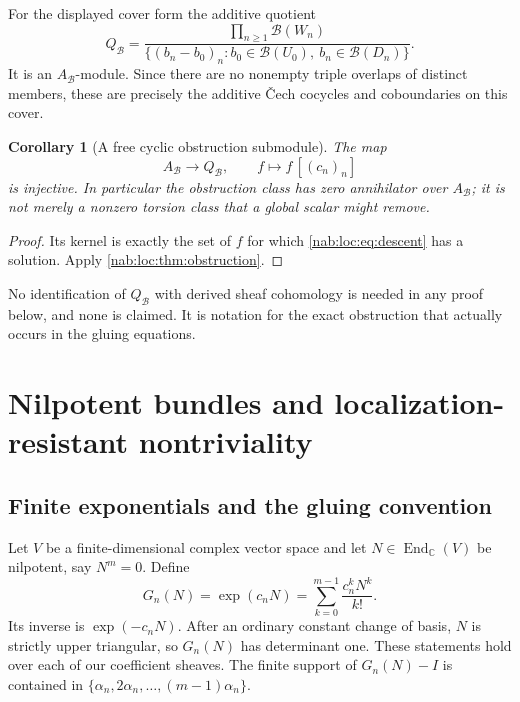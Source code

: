 \documentclass[11pt,letterpaper]{article}
\newtheorem{corollary}[corollary]{Corollary}
\theoremstyle{definition}
\theoremstyle{remark}
\newcommand{\C}{\mathbb C}
\newcommand{\BB}{\mathscr B}
\newcommand{\Aglob}{A_{\BB}}
\newcommand{\End}{\operatorname{End}}
\numberwithin{equation}{section}
\begin{document}
For the displayed cover form the additive quotient
\[
 Q_{\BB}=
 \frac{\displaystyle\prod_{n\geq1}\BB(W_n)}
 {\displaystyle\{(b_n-b_0)_n:b_0\in\BB(U_0),\ b_n\in\BB(D_n)\}}.
\]
It is an $\Aglob$-module. Since there are no nonempty triple overlaps of
distinct members, these are precisely the additive \v{C}ech cocycles and
coboundaries on this cover.

\begin{corollary}[A free cyclic obstruction submodule]\label{nab:loc:cor:annihilator}
The map
\[
 \Aglob\longrightarrow Q_{\BB},\qquad f\longmapsto f\,[(c_n)_n]
\]
is injective. In particular the obstruction class has zero annihilator over
$\Aglob$; it is not merely a nonzero torsion class that a global scalar might
remove.
\end{corollary}

\begin{proof}
Its kernel is exactly the set of $f$ for which \eqref{nab:loc:eq:descent} has a
solution. Apply \cref{nab:loc:thm:obstruction}.
\end{proof}

No identification of $Q_{\BB}$ with derived sheaf cohomology is needed in any
proof below, and none is claimed. It is notation for the exact obstruction
that actually occurs in the gluing equations.

\section{Nilpotent bundles and localization-resistant nontriviality}
\label{nab:loc:sec:bundles}

\subsection{Finite exponentials and the gluing convention}
\label{nab:loc:sub:finite-exp}

Let $V$ be a finite-dimensional complex vector space and let
$N\in\End_\C(V)$ be nilpotent, say $N^m=0$. Define
\begin{equation}\label{nab:loc:eq:general-transition}
 G_n(N)=\exp(c_nN)=\sum_{k=0}^{m-1}\frac{c_n^kN^k}{k!}.
\end{equation}
Its inverse is $\exp(-c_nN)$. After an ordinary constant change of basis, $N$
is strictly upper triangular, so $G_n(N)$ has determinant one. These
statements hold over each of our coefficient sheaves. The finite support of
$G_n(N)-I$ is contained in $\{\alpha_n,2\alpha_n,\ldots,(m-1)\alpha_n\}$.
\end{document}
